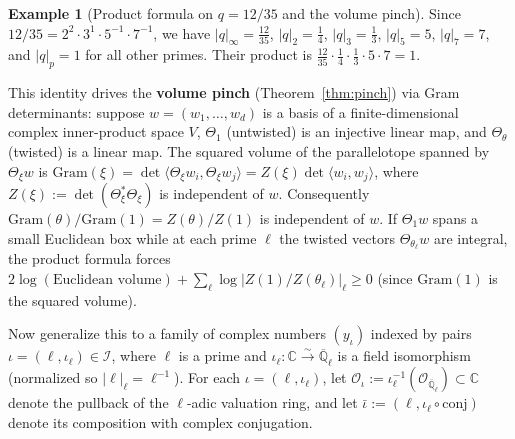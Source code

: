 \documentclass[11pt]{amsart}
\newcommand{\CC}{\mathbb{C}}
\newcommand{\QQ}{\mathbb{Q}}
\theoremstyle{definition}
\newtheorem{example}[theorem]{Example}
\theoremstyle{remark}
\begin{document}
\begin{example}[Product formula on $q=12/35$ and the volume pinch]\label{ex:prod1235}
Since $12/35=2^2\cdot 3^1\cdot 5^{-1}\cdot 7^{-1}$, we have $|q|_\infty=\frac{12}{35}$, $|q|_2=\frac14$, $|q|_3=\frac13$, $|q|_5=5$, $|q|_7=7$, and $|q|_p=1$ for all other primes. Their product is $\frac{12}{35}\cdot\frac14\cdot\frac13\cdot 5\cdot 7=1$.

This identity drives the \textbf{volume pinch} (Theorem~\ref{thm:pinch}) via Gram determinants: suppose $w=(w_1,\dots,w_d)$ is a basis of a finite-dimensional complex inner-product space $V$, $\Theta_1$ (untwisted) is an injective linear map, and $\Theta_\theta$ (twisted) is a linear map. The squared volume of the parallelotope spanned by $\Theta_\xi w$ is $\mathrm{Gram}(\xi)=\det\langle\Theta_\xi w_i,\Theta_\xi w_j\rangle=Z(\xi)\det\langle w_i,w_j\rangle$, where $Z(\xi):=\det(\Theta_\xi^*\Theta_\xi)$ is independent of $w$. Consequently $\mathrm{Gram}(\theta)/\mathrm{Gram}(1)=Z(\theta)/Z(1)$ is independent of $w$. If $\Theta_1 w$ spans a small Euclidean box while at each prime $\ell$ the twisted vectors $\Theta_{\theta_\ell}w$ are integral, the product formula forces $2\log(\text{Euclidean volume})+\sum_\ell\log|Z(1)/Z(\theta_\ell)|_\ell\ge 0$ (since $\mathrm{Gram}(1)$ is the squared volume).
\end{example}

Now generalize this to a family of complex numbers $(y_\iota)$ indexed by pairs $\iota=(\ell,\iota_\ell)\in\mathcal{I}$, where $\ell$ is a prime and $\iota_\ell\colon\CC\xrightarrow{\sim}\overline{\QQ}_\ell$ is a field isomorphism (normalized so $|\ell|_\ell=\ell^{-1}$). For each $\iota=(\ell,\iota_\ell)$, let $\mathcal{O}_\iota:=\iota_\ell^{-1}(\mathcal{O}_{\overline{\QQ}_\ell})\subset\CC$ denote the pullback of the $\ell$-adic valuation ring, and let $\bar\iota:=(\ell,\iota_\ell\circ\mathrm{conj})$ denote its composition with complex conjugation.
\end{document}
